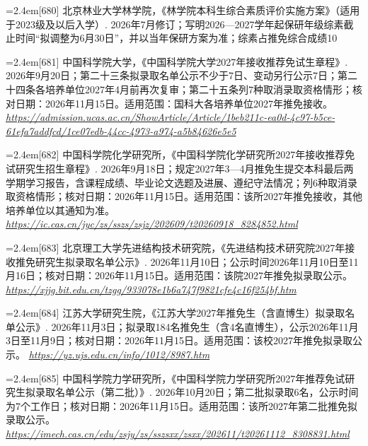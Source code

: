 \par\noindent\hangindent=2.4em\label{src:S0826}{\color{cAccent}[680]} 北京林业大学林学院，《林学院本科生综合素质评价实施方案》（适用于2023级及以后入学）. 2026年7月修订；写明2026—2027学年起保研年级综素截止时间“拟调整为6月30日”，并以当年保研方案为准；综素占推免综合成绩10%
\par\noindent\hangindent=2.4em\label{src:S0827}{\color{cAccent}[681]} 中国科学院大学，《中国科学院大学2027年接收推荐免试生章程》. 2026年9月20日；第二十三条拟录取名单公示不少于7日、变动另行公示7日；第二十四条各培养单位2027年4月前再次复审；第二十五条列7种取消录取资格情形；核对日期：2026年11月15日。适用范围：国科大各培养单位2027年推免接收。 \textit{\url{https://admission.ucas.ac.cn/ShowArticle/Article/1beb211c-ea0d-4c97-b5ce-61efa7addfcd/1ce07edb-44cc-4973-a974-a5b84626e5e5}}\par
\par\noindent\hangindent=2.4em\label{src:S0828}{\color{cAccent}[682]} 中国科学院化学研究所，《中国科学院化学研究所2027年接收推荐免试研究生招生章程》. 2026年9月18日；规定2027年3—4月推免生提交本科最后两学期学习报告，含课程成绩、毕业论文选题及进展、遵纪守法情况；列6种取消录取资格情形；核对日期：2026年11月15日。适用范围：该所2027年推免接收，其他培养单位以其通知为准。 \textit{\url{https://ic.cas.cn/jyc/zs/sszs/zsjz/202609/t20260918_8284852.html}}\par
\par\noindent\hangindent=2.4em\label{src:S0829}{\color{cAccent}[683]} 北京理工大学先进结构技术研究院，《先进结构技术研究院2027年接收推免研究生拟录取名单公示》. 2026年11月10日；公示时间2026年11月10日至11月16日；核对日期：2026年11月15日。适用范围：该院2027年推免拟录取公示。 \textit{\url{https://xjjg.bit.edu.cn/tzgg/933078e1b6a747f9821cfe4c16f254bf.htm}}\par
\par\noindent\hangindent=2.4em\label{src:S0830}{\color{cAccent}[684]} 江苏大学研究生院，《江苏大学2027年推免生（含直博生）拟录取名单公示》. 2026年11月3日；拟录取184名推免生（含4名直博生），公示2026年11月3日至11月9日；核对日期：2026年11月15日。适用范围：该校2027年推免拟录取公示。 \textit{\url{https://yz.ujs.edu.cn/info/1012/8987.htm}}\par
\par\noindent\hangindent=2.4em\label{src:S0831}{\color{cAccent}[685]} 中国科学院力学研究所，《中国科学院力学研究所2027年推荐免试研究生拟录取名单公示（第二批）》. 2026年10月20日；第二批拟录取6名，公示时间为7个工作日；核对日期：2026年11月15日。适用范围：该所2027年第二批推免拟录取公示。 \textit{\url{https://imech.cas.cn/edu/zsjy/zs/sszsxx/zsxx/202611/t20261112_8308831.html}}\par
